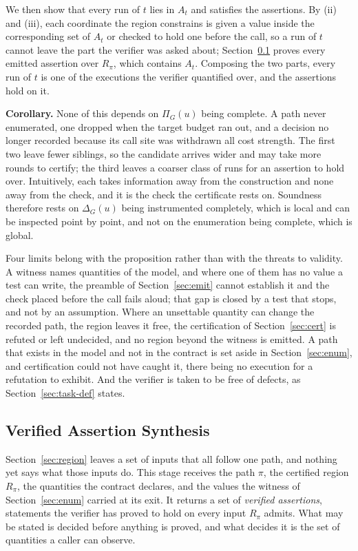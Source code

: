 \documentclass[manuscript,anonymous]{acmart}
\begin{document}
We then show that every run of $t$ lies in $A_t$ and satisfies the assertions. By
(ii) and (iii), each coordinate the region constrains is given a value inside the
corresponding set of $A_t$ or checked to hold one before the call, so a run of
$t$ cannot leave the part the verifier was asked about;
Section~\ref{sec:oracle} proves every emitted assertion over $R_\pi$, which
contains $A_t$. Composing the two parts, every run of $t$ is one of the
executions the verifier quantified over, and the assertions hold on it.

\noindent\textbf{Corollary.} None of this depends on $\Pi_G(u)$ being complete.
A path never enumerated, one dropped when the target budget ran out, and a
decision no longer recorded because its call site was withdrawn all cost
strength. The first two leave fewer siblings, so the candidate arrives wider
and may take more rounds to certify; the third leaves a coarser class of runs
for an assertion to hold over. Intuitively, each takes information away from
the construction and none away from the check, and it is the check the
certificate rests on. Soundness therefore rests on $\Delta_G(u)$ being
instrumented completely, which is local and can be inspected point by point,
and not on the enumeration being complete, which is global.

Four limits belong with the proposition rather than with the threats to
validity. A witness names quantities of the model, and where one of them has no
value a test can write, the preamble of Section~\ref{sec:emit} cannot establish
it and the check placed before the call fails aloud; that gap is closed by a
test that stops, and not by an assumption. Where an unsettable quantity can
change the recorded path, the region leaves it free, the certification of
Section~\ref{sec:cert} is refuted or left undecided, and no region beyond the
witness is emitted. A path that exists in the model and not in the contract is
set aside in Section~\ref{sec:enum}, and certification could not have caught
it, there being no execution for a refutation to exhibit. And the verifier is
taken to be free of defects, as Section~\ref{sec:task-def} states.

\subsection{Verified Assertion Synthesis}\label{sec:oracle}

Section~\ref{sec:region} leaves a set of inputs that all follow one path, and
nothing yet says what those inputs do. This stage receives the path $\pi$, the
certified region $R_\pi$, the quantities the contract declares, and the values
the witness of Section~\ref{sec:enum} carried at its exit. It returns a set of
\emph{verified assertions}, statements the verifier has proved to hold on every
input $R_\pi$ admits. What may be stated is
decided before anything is proved, and what decides it is the set of quantities
a caller can observe.
\end{document}
